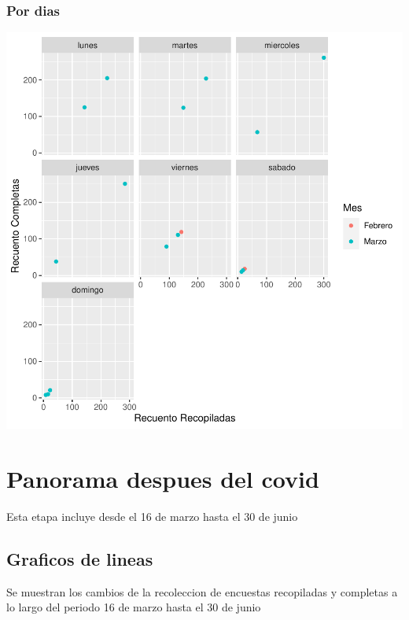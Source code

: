 \documentclass{article}
\begin{document}
\subsubsection{Por dias}

\includegraphics{seguimento2-029}

\section{Panorama despues del covid}
Esta etapa incluye desde el 16 de marzo hasta el 30 de junio

\subsection{Graficos de lineas}
Se muestran los cambios de la recoleccion de encuestas recopiladas y completas a lo largo del periodo 16 de marzo hasta el 30 de junio
\end{document}
